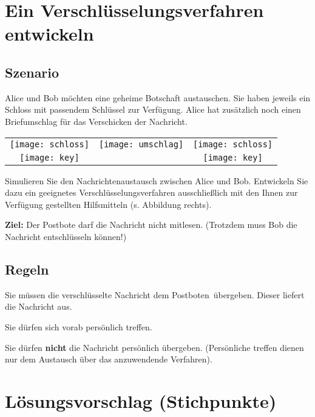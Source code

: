\documentclass[]{schulein}
\begin{document}
 
\section*{Ein Verschlüsselungsverfahren entwickeln}
\subsection*{Szenario}
Alice und Bob möchten eine geheime Botschaft austauschen. Sie haben jeweils ein Schloss mit passendem Schlüssel zur Verfügung. Alice hat zusätzlich noch einen Briefumschlag für das Verschicken der Nachricht.

\par
\begin{floatingfigure}[r]{7cm}
\renewcommand{\arraystretch}{0}
\begin{tabular}{ccc}
\texttt{[image: schloss]} & 
\texttt{[image: umschlag]}&
\texttt{[image: schloss]} \\
\hspace*{-.7cm}\texttt{[image: key]}& &
\hspace*{-.7cm}\texttt{[image: key]}
\end{tabular}
\end{floatingfigure}
Simulieren Sie den Nachrichtenaustausch zwischen Alice und Bob. Entwickeln Sie dazu ein geeignetes Verschlüsselungsverfahren ausschließlich mit den Ihnen zur Verfügung gestellten Hilfsmitteln (s. Abbildung rechts).

\textbf{Ziel:} Der Postbote darf die Nachricht nicht mitlesen. (Trotzdem muss Bob die Nachricht entschlüsseln können!)
%
\subsection*{Regeln}
\begin{smallitemize}
\item Sie müssen die verschlüsselte Nachricht dem \glqq Postboten\grqq\ übergeben. Dieser liefert die Nachricht aus.
\item Sie dürfen sich vorab persönlich treffen.
\item Sie dürfen \textbf{nicht} die Nachricht persönlich übergeben. (Persönliche treffen dienen nur dem Austausch über das anzuwendende Verfahren).
\end{smallitemize}


\section*{Lösungsvorschlag (Stichpunkte)}
\luecke{\textwidth}\\[2ex]
\luecke{\textwidth}\\[2ex]
\luecke{\textwidth}\\[2ex]
\luecke{\textwidth}\\[2ex]
\luecke{\textwidth}
\end{document}
